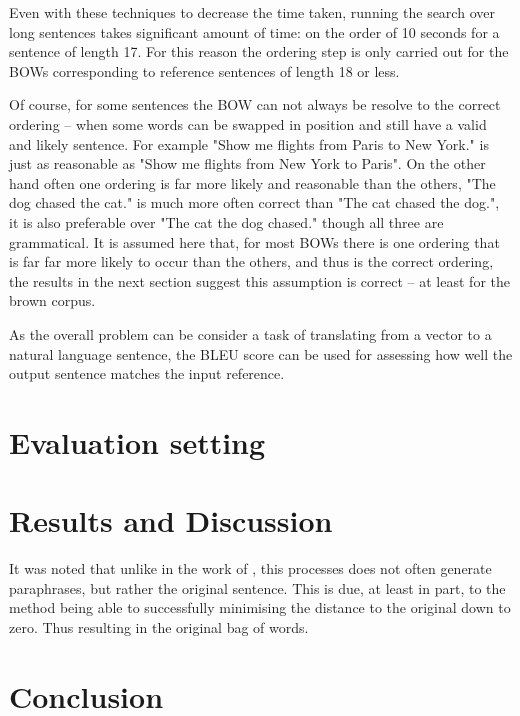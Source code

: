 \documentclass[]{scrartcl}
\numberwithin{equation}{section}
\numberwithin{figure}{section}
\theoremstyle{plain}
\theoremstyle{definition}
\begin{document}
Even with these techniques to decrease the time taken, running the search over long sentences takes significant amount of time: on the order of 10 seconds for a sentence of length 17. For this reason the ordering step is only carried out for the BOWs corresponding to reference sentences of length 18 or less. 
 
 
Of course, for some sentences the BOW can not always be resolve to the correct ordering -- when some words can be swapped in position and still have a valid and likely sentence. For example "Show me flights from Paris to New York." is just as reasonable as  "Show me flights from New York to Paris". On the other hand often one ordering is far more likely and reasonable than the others, "The dog chased the cat." is much more often correct than "The cat chased the dog.", it is also preferable over "The cat the dog chased." though all three are grammatical. It is assumed here that, for most BOWs there is one ordering that is far far more likely to occur than the others, and thus is the correct ordering, the results in the next section suggest this assumption is correct -- at least for the brown corpus. 
  


As the overall problem can be consider a task of translating from a vector to a natural language sentence, the BLEU  score \parencite{Papineni2002} can be used for assessing how well the output sentence matches the input reference.

\section{Evaluation setting}

\section{Results and Discussion}

It was noted that unlike in the work of \cite{iyyer2014generating}, this processes does not often generate paraphrases, but rather the original sentence. This is due, at least in part, to the method being able to successfully minimising the distance to the original down to zero. Thus resulting in the original bag of words.

\section{Conclusion}
\end{document}
